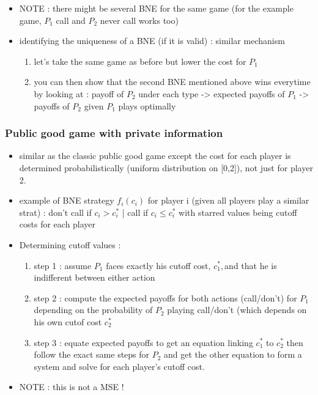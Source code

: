 \documentclass{article}
\begin{document}
\begin{itemize}
    \item NOTE : there might be several BNE for the same game (for the example game, $P_1$ call and $P_2$ never call works too)
    \item identifying the uniqueness of a BNE (if it is valid) : similar mechanism
    \begin{enumerate}
        \item let's take the same game as before but lower the cost for $P_1$
        \item you can then show that the second BNE mentioned above wins everytime by looking at : payoff of $P_2$ under each type -> expected payoffs of $P_1$ -> payoffs of $P_2$ given $P_1$ plays optimally
    \end{enumerate}
\end{itemize}

\subsubsection{Public good game with private information}
\begin{itemize}
    \item similar as the classic public good game except the cost for each player is determined probabilistically (uniform distribution on [0,2]), not just for player 2.
    \item example of BNE strategy $f_i(c_i)$ for player i (given all players play a similar strat) : don't call if $c_i > c_i^*$ | call if  $c_i\leq c_i^*$ with starred values being cutoff costs for each player
    \item Determining cutoff values :
    \begin{enumerate}
        \item step 1 : assume $P_1$ faces exactly his cutoff cost, $c_1^*,$and that he is indifferent between either action
        \item step 2 : compute the expected payoffs for both actions (call/don't) for $P_1$ depending on the probability of $P_2$ playing call/don't (which depends on his own cutof cost $c_2^*$
        \item step 3 : equate expected payoffs to get an equation linking $c_1^*$ to $c_2^*$ then follow the exact same steps for $P_2$ and get the other equation to form a system and solve for each player's cutoff cost. 
    \end{enumerate}
    \item NOTE : this is not a MSE ! 
\end{itemize}
\end{document}
